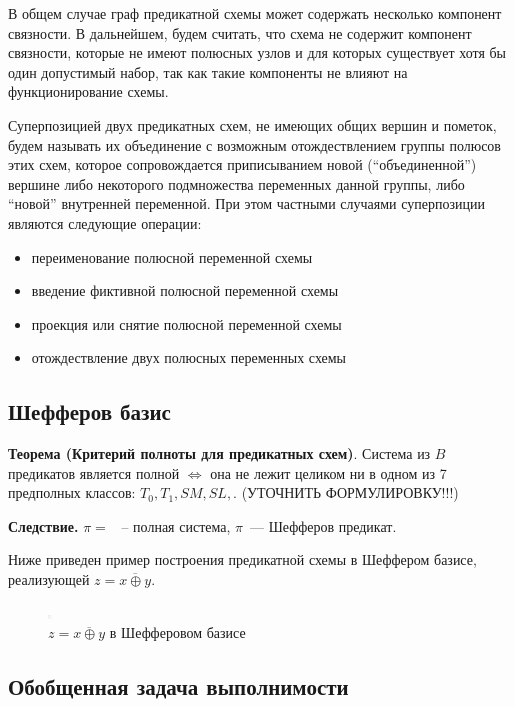 \documentclass[12pt]{article}
\begin{document}
В общем случае граф предикатной схемы может содержать несколько компонент связности. 
В дальнейшем, будем считать, что схема не содержит компонент связности, 
которые не имеют полюсных узлов и для которых существует хотя бы один допустимый набор, так как такие компоненты не влияют на функционирование схемы.

Суперпозицией двух предикатных схем, не имеющих общих вершин и пометок, 
будем называть их объединение с возможным отождествлением группы полюсов этих схем, 
которое сопровождается приписыванием новой (``объединенной'') вершине либо 
некоторого подмножества переменных данной группы, либо ``новой'' внутренней переменной.
 При этом частными случаями суперпозиции являются следующие операции:
\begin{itemize}
\item переименование полюсной переменной схемы

\item введение фиктивной полюсной переменной схемы

\item проекция или снятие полюсной переменной схемы

\item отождествление двух полюсных переменных схемы
\end{itemize}

\subsection{Шефферов базис}

\textbf{Теорема (Критерий полноты для предикатных схем)}. Система из $B$ предикатов является полной $\iff$
она не лежит целиком ни в одном из 7 предполных классов: $T_0, T_1, SM, SL, $. (УТОЧНИТЬ ФОРМУЛИРОВКУ!!!)

\textbf{Следствие.} $\pi =  $ ~-- полная система, $\pi$~--- Шефферов предикат.

Ниже приведен пример построения предикатной схемы в Шеффером базисе, реализующей $z=\overline{x \oplus y}$.

\begin{figure}[htb]
\centering
\includegraphics[width=0.01\textwidth]{constraint_graph.png}
\caption{$z=\overline{x \oplus y}$ в Шефферовом базисе}
\label{fig:sheff}
\end{figure}

\subsection{Обобщенная задача выполнимости}
\end{document}
